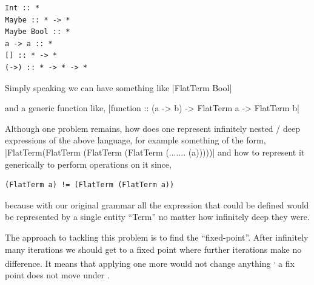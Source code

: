 \documentclass[thesis-solanki.tex]{subfiles}
\begin{document}
\begin{verbatim}
Int :: *
Maybe :: * -> *
Maybe Bool :: *
a -> a :: *
[] :: * -> *
(->) :: * -> * -> *
\end{verbatim}

Simply speaking we can have something like
|FlatTerm Bool|

and a generic function like,
|function :: (a -> b) -> FlatTerm a -> FlatTerm b|

Although one problem remains, how does one represent infinitely nested / deep expressions of the above language,
for example something of the form,
\newline
{}|FlatTerm(FlatTerm (FlatTerm (FlatTerm (....... (a)))))|
\mbox{}\newline
and how to represent it generically to perform operations on it since,
\begin{verbatim}
(FlatTerm a) != (FlatTerm (FlatTerm a))
\end{verbatim}
%
because with our original grammar all the expression that could be defined would be represented by a single entity
``Term'' no matter how infinitely deep they were.

The approach to tackling this problem is to find the ``fixed-point''.
After infinitely many iterations we should get to a fixed point where further iterations make no
difference.
It means that applying one more  would not change anything \textsuperscript{,}
a fix point does not move under .
\end{document}
